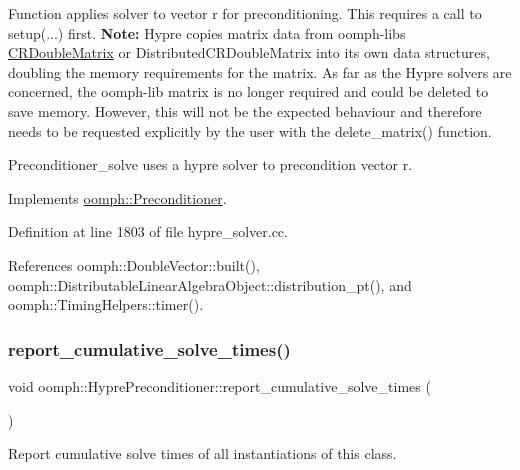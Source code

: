 Function applies solver to vector r for preconditioning. This requires a call to setup(...) first. {\bfseries Note\+:} Hypre copies matrix data from oomph-\/lib\textquotesingle{}s \hyperlink{classoomph_1_1CRDoubleMatrix}{C\+R\+Double\+Matrix} or Distributed\+C\+R\+Double\+Matrix into its own data structures, doubling the memory requirements for the matrix. As far as the Hypre solvers are concerned, the oomph-\/lib matrix is no longer required and could be deleted to save memory. However, this will not be the expected behaviour and therefore needs to be requested explicitly by the user with the delete\+\_\+matrix() function. 

Preconditioner\+\_\+solve uses a hypre solver to precondition vector r. 

Implements \hyperlink{classoomph_1_1Preconditioner_ace1199369e4465cd2b9a34884bb64ec8}{oomph\+::\+Preconditioner}.



Definition at line 1803 of file hypre\+\_\+solver.\+cc.



References oomph\+::\+Double\+Vector\+::built(), oomph\+::\+Distributable\+Linear\+Algebra\+Object\+::distribution\+\_\+pt(), and oomph\+::\+Timing\+Helpers\+::timer().

\mbox{\label{classoomph_1_1HyprePreconditioner_aaca6bf7cf440f56ca8e901de64f1da9e}} 
\subsubsection{\texorpdfstring{report\+\_\+cumulative\+\_\+solve\+\_\+times()}{report\_cumulative\_solve\_times()}}
{\footnotesize\ttfamily void oomph\+::\+Hypre\+Preconditioner\+::report\+\_\+cumulative\+\_\+solve\+\_\+times (\begin{DoxyParamCaption}{ }\end{DoxyParamCaption})\hspace{0.3cm}{\ttfamily [static]}}



Report cumulative solve times of all instantiations of this class. 



